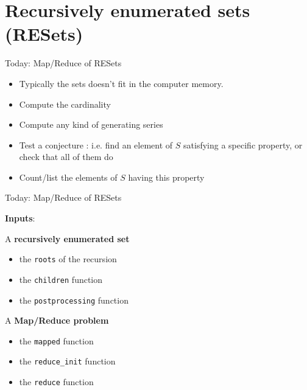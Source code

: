 \documentclass[compress,11pt]{beamer}
\begin{document}
\section{Recursively enumerated sets (RESets)}
\begin{frame}[fragile]{Today: Map/Reduce of RESets}

  \begin{center}
  \end{center}
  \bigskip\pause

  \begin{itemize}
  \item Typically the sets doesn't fit in the computer memory.
    \medskip

  \item Compute the cardinality
  \item Compute any kind of generating series
  \item Test a conjecture : i.e. find an element of $S$ satisfying a specific
    property, or check that all of them do
  \item Count/list the elements of $S$ having this property
  \end{itemize}
\end{frame}

\begin{frame}[fragile]{Today: Map/Reduce of RESets}

  \textbf{Inputs}:
  \bigskip

  A \textbf{recursively enumerated set}
  \begin{itemize}
  \item the \texttt{roots} of the recursion
  \item the \texttt{children} function
  \item the \texttt{postprocessing} function
  \end{itemize}
  A \textbf{Map/Reduce problem}
  \begin{itemize}
  \item the \texttt{mapped} function
  \item the \verb|reduce_init| function
  \item the \texttt{reduce} function
  \end{itemize}
\end{frame}
\end{document}

